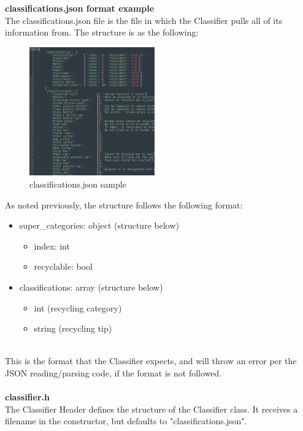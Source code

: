 \documentclass[conference]{IEEEtran}
\begin{document}
\textbf{classifications.json format example}~\\

The classifications.json file is the file in which the Classifier pulls all of its information from. The structure is as the following:

\begin{figure}[h]
    \centering
    \includegraphics[width=0.48\textwidth]{images/sourcecode/classifications_json.eps}
    \caption{classifications.json sample}
\end{figure}

As noted previously, the structure follows the following format:

\begin{itemize}
\item super\_categories: object (structure below)
\begin{itemize}
\item index: int
\item recyclable: bool
\end{itemize}
\item classifications: array (structure below)
\begin{itemize}
\item int (recycling category)
\item string (recycling tip)
\end{itemize}
\end{itemize}~\\

This is the format that the Classifier expects, and will throw an error per the JSON reading/parsing code, if the format is not followed.~\\~\\


\textbf{classifier.h}~\\

The Classifier Header defines the structure of the Classifier class. It receives a filename in the constructor, but defaults to "classifications.json".
\end{document}
